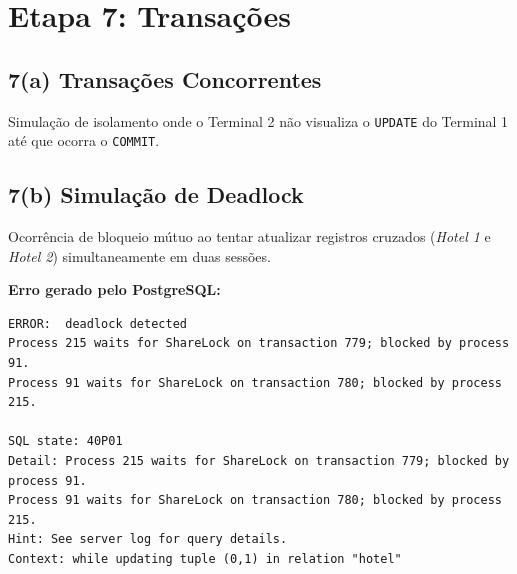 \documentclass[11pt, a4paper]{article}
\begin{document}
\clearpage

\section{Etapa 7: Transações}

\subsection{7(a) Transações Concorrentes}
Simulação de isolamento onde o Terminal 2 não visualiza o \texttt{UPDATE} do Terminal 1 até que ocorra o \texttt{COMMIT}.

\subsection{7(b) Simulação de Deadlock}
Ocorrência de bloqueio mútuo ao tentar atualizar registros cruzados (\textit{Hotel 1} e \textit{Hotel 2}) simultaneamente em duas sessões.

\textbf{Erro gerado pelo PostgreSQL:}
\begin{verbatim}
ERROR:  deadlock detected
Process 215 waits for ShareLock on transaction 779; blocked by process 91.
Process 91 waits for ShareLock on transaction 780; blocked by process 215. 

SQL state: 40P01
Detail: Process 215 waits for ShareLock on transaction 779; blocked by process 91.
Process 91 waits for ShareLock on transaction 780; blocked by process 215.
Hint: See server log for query details.
Context: while updating tuple (0,1) in relation "hotel"
\end{verbatim}
\end{document}
